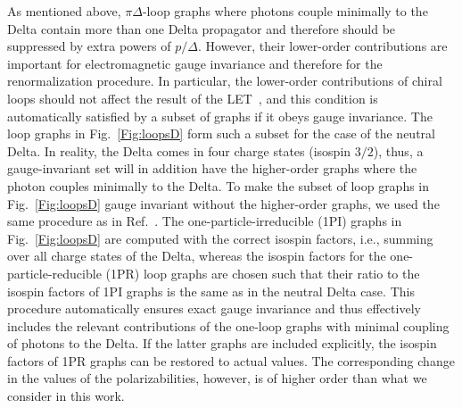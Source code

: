 \documentclass[11pt,preprint,tightenlines,
showpacs,preprintnumbers,amsmath,amssymb,superscriptaddress,a4paper,nofootinbib]{revtex4-1}
\def\bea{\begin{eqnarray}}
\def\eea{\end{eqnarray}}
\def\nn{\nonumber}
\begin{document}
As mentioned above, $\pi \Delta$-loop graphs where photons couple minimally to the Delta contain more 
than one Delta propagator and therefore should be suppressed by extra powers of $p/\varDelta$.
However, their lower-order contributions are important for electromagnetic gauge invariance and therefore for the 
renormalization procedure. In particular, the lower-order contributions of chiral loops should not affect the result of the LET~\cite{ Low:1954kd, Gell_Mann:1954kc}, and this condition is automatically satisfied by a subset of graphs if it obeys gauge invariance. The loop graphs in 
Fig.~\ref{Fig:loopsD} form such a subset for the case of the neutral Delta. In reality, the Delta comes in four charge states (isospin $3/2$), thus, a 
gauge-invariant set will in addition have the higher-order graphs where the photon couples minimally to the Delta. To make the subset of loop graphs 
in Fig.~\ref{Fig:loopsD} gauge invariant without the higher-order graphs, we used the same procedure as in Ref.~\cite{Lensky:2009uv}. The one-particle-irreducible (1PI) graphs in Fig.~\ref{Fig:loopsD} are computed with the correct isospin factors, i.e., summing over all charge 
states of the Delta, whereas the isospin factors for the one-particle-reducible (1PR) loop graphs are chosen such that their ratio to the isospin factors
of 1PI graphs is the same as in the neutral Delta case. This procedure automatically ensures exact gauge invariance and thus 
effectively includes the relevant contributions of the one-loop graphs with minimal coupling of photons to the Delta. If the latter graphs 
are included explicitly, the isospin factors of 1PR graphs can be restored to actual values.
The corresponding change in the values of the polarizabilities, however, is of higher order than what we consider in this work.



\end{document}
